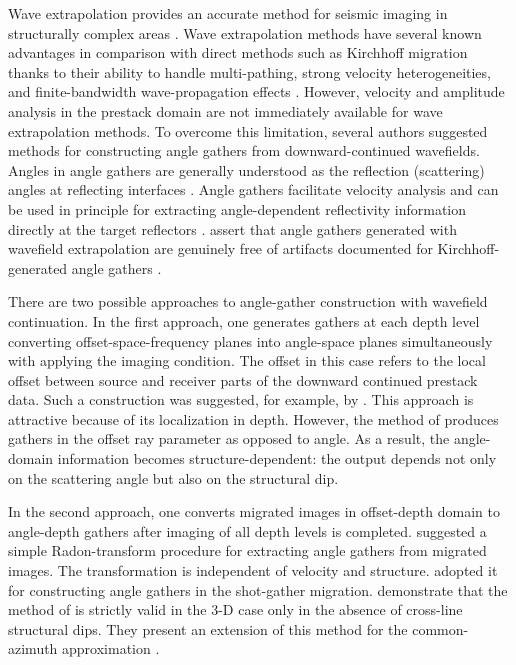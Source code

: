 Wave extrapolation provides an accurate method for seismic imaging in
structurally complex areas \cite[]{biondi,etgen}. Wave
extrapolation methods have several known advantages in comparison with
direct methods such as Kirchhoff migration thanks to their ability to
handle multi-pathing, strong velocity heterogeneities, and
finite-bandwidth wave-propagation effects
\cite[]{GEO66-05-16221640}.  However, velocity and amplitude analysis in the
prestack domain are not immediately available for wave extrapolation
methods. To overcome this limitation, several authors
\cite[]{GEO55-09-12231234,SEG-1999-08240827,SEG-2000-08300833,GEO67-03-08830889,wu,SEG-2003-08890892,GEO68-03-10651074,cig,tsic}
suggested methods for constructing angle gathers from downward-continued
wavefields. Angles in angle gathers are generally understood as the reflection
(scattering) angles at reflecting interfaces \cite[]{xu,hoop}. Angle gathers
facilitate velocity analysis \cite[]{SEG-2001-08850888,stork} and can be used in
principle for extracting angle-dependent reflectivity information directly at
the target reflectors \cite[]{SEG-2001-02960299}. \cite{stolk} assert that
angle gathers generated with wavefield extrapolation are genuinely free of
artifacts documented for Kirchhoff-generated angle gathers \cite[]{symes,symes2}.

There are two possible approaches to angle-gather construction with wavefield
continuation. In the first approach, one generates gathers at each depth level
converting offset-space-frequency planes into angle-space planes
simultaneously with applying the imaging condition. The offset in this case
refers to the local offset between source and receiver parts of the downward
continued prestack data. Such a construction was suggested, for example, by
\cite{SEG-1999-08240827}. This approach is attractive because of its
localization in depth. However, the method of \cite{SEG-1999-08240827}
produces gathers in the offset ray parameter as opposed to angle. As a result,
the angle-domain information becomes structure-dependent: the output depends
not only on the scattering angle but also on the structural dip.

In the second approach, one converts migrated images in offset-depth domain to
angle-depth gathers after imaging of all depth levels is completed.
\cite{GEO68-03-10651074} suggested a simple Radon-transform procedure for
extracting angle gathers from migrated images. The transformation is
independent of velocity and structure. \cite{GEO67-03-08830889} adopted it
for constructing angle gathers in the shot-gather migration.  \cite{new}
demonstrate that the method of \cite{GEO68-03-10651074} is strictly valid
in the 3-D case only in the absence of cross-line structural dips. They
present an extension of this method for the common-azimuth approximation
\cite[]{GEO61-06-18221832}.

